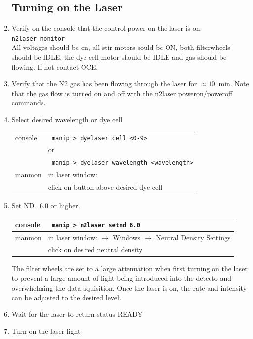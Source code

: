 \documentclass[11pt]{article}
\begin{document}
\begin{enumerate}
\subsection{Turning on the Laser}
\item \CheckBox[name=rlup47]{} Verify on the console that the control power on the laser is on: \\ \verb+n2laser monitor+\\ All voltages should be on, all stir motors sould be ON, both filterwheels should be IDLE, the dye cell motor should be IDLE and gas should be flowing. If not contact OCE.
\item \CheckBox[name=rlup48]{} Verify that the N2 gas has been flowing through the laser for $\approx 10$~min. Note that the gas flow is turned on and off with the n2laser poweron/poweroff commands.
\item \CheckBox[name=rlup49]{} Select desired wavelength or dye cell
\begin{center}
\begin{tabular}{|l|l|}
\hline
console & \verb+ manip > dyelaser cell <0-9>+ \\
 & or \\
 & \verb+ manip > dyelaser wavelength <wavelength>+ \\
\hline
manmon & in laser window: \\ & click on button above desired dye cell \\
\hline
\end{tabular}
\end{center}
\item \CheckBox[name=rlup50]{} Set ND=6.0 or higher.
\begin{center}
\begin{tabular}{|l|l|}
\hline
console & \verb+ manip > n2laser setnd 6.0+ \\
\hline
manmon & in laser window: $\to$ Windows $\to$ Neutral Density Settings\\
& click on desired neutral density \\
\hline
\end{tabular}
\end{center}
The filter wheels are set to a large attenuation when first turning on the laser to prevent a large amount of light being introduced into the detecto and overwhelming the data aquisition. Once the laser is on, the rate and intensity can be adjusted to the desired level.
\item  \CheckBox[name=rlup51]{} Wait for the laser to return status READY
\item  \CheckBox[name=rlup52]{} Turn on the laser light

\end{enumerate}
\end{document}
